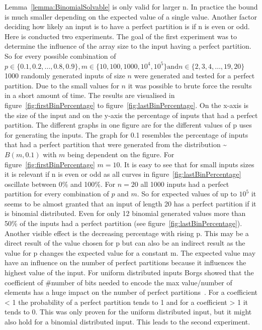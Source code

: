 Lemma~\ref{lemma:BinomialSolvable} is only valid for larger n. In practice the bound is much smaller depending on the expected value of a single value. Another factor deciding how likely an input is to have a perfect partition is if n is even or odd. Here is conducted two experiments. The goal of the first experiment was to determine the influence of the array size to the input having a perfect partition. So for every possible combination of $p \in \{0.1, 0.2, \dots , 0.8, 0.9\}, m \in \{10,100,1000,10^4,10^5\} \text{and} n \in \{2,3,4,\dots,19,20\}$ 1000 randomly generated inputs of size $n$ were generated and tested for a perfect partition. Due to the small values for $n$ it was possible to brute force the results in a short amount of time. The results are visualised in figure~\ref{fig:firstBinPercentage} to figure~\ref{fig:lastBinPercentage}. 
On the x-axis is the size of the input and on the y-axis the percentage of inputs that had a perfect partition. The different graphs in one figure are for the different values of p uses for generating the inputs. The graph for 0.1 resembles the percentage of inputs that had a perfect partition that were generated from the distribution \textasciitilde$B(m,0.1)$ with $m$ being dependent on the figure. For figure~\ref{fig:firstBinPercentage} $m=10$.\newline
It is easy to see that for small inputs sizes it is relevant if n is even or odd as all curves in figure~\ref{fig:lastBinPercentage} oscillate between 0\% and 100\%. For $n=20$ all 1000 inputs had a perfect partition for every combination of $p$ and $m$. So for expected values of up to $10^5$ it seems to be almost granted that an input of length 20 has a perfect partition if it is binomial distributed. Even for only 12 binomial generated values more than 50\% of the inputs had a perfect partition (see figure~\ref{fig:lastBinPercentage}). Another visible effect is the decreasing percentage with rising p. This may be a direct result of the value chosen for p but can also be an indirect result as the value for p changes the expected value for a constant m. The expected value may have an influence on the number of perfect partitions because it influences the highest value of the input. For uniform distributed inputs Borgs showed that the coefficient of \#number of bits needed to encode the max value/number of elements has a huge impact on the number of perfect partitions~\cite{borgs2001phase}. For a coefficient < 1 the probability of a perfect partition tends to 1 and for a coefficient > 1 it tends to 0. This was only proven for the uniform distributed input, but it might also hold for a binomial distributed input. This leads to the second experiment.

